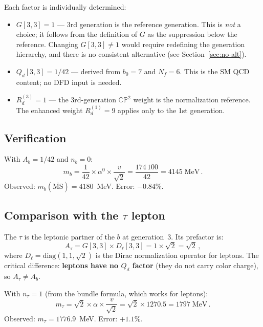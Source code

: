\documentclass[11pt,a4paper]{article}
\newcommand{\CP}{\mathbb{CP}}
\theoremstyle{definition}
\theoremstyle{remark}
\begin{document}
Each factor is individually determined:
\begin{itemize}
\item $G[3,3] = 1$ --- 3rd generation is the reference generation.
      This is \emph{not} a choice; it follows from the definition of $G$
      as the suppression below the reference.  Changing $G[3,3] \neq 1$
      would require redefining the generation hierarchy, and there is no
      consistent alternative (see Section~\ref{sec:no-alt}).
\item $Q_d[3,3] = 1/42$ --- derived from $b_0 = 7$ and $N_f = 6$.
      This is the SM QCD content; no DFD input is needed.
\item $R_d^{(3)} = 1$ --- the 3rd-generation $\CP^2$ weight is the
      normalization reference.  The enhanced weight $R_d^{(1)} = 9$ applies
      only to the 1st generation.
\end{itemize}

\subsection{Verification}

With $A_b = 1/42$ and $n_b = 0$:
\begin{equation}
m_b = \frac{1}{42} \times \alpha^0 \times \frac{v}{\sqrt{2}}
    = \frac{174\,100}{42} = 4145 \;\text{MeV}\,.
\end{equation}
Observed: $m_b(\overline{\text{MS}}) = 4180$~MeV.  Error: $-0.84\%$.

\subsection{Comparison with the $\tau$ lepton}

The $\tau$ is the leptonic partner of the $b$ at generation~3.  Its prefactor is:
\begin{equation}
A_\tau = G[3,3] \times D_\ell[3,3] = 1 \times \sqrt{2} = \sqrt{2}\,,
\end{equation}
where $D_\ell = \text{diag}(1,1,\sqrt{2})$ is the Dirac normalization
operator for leptons.  The critical difference: \textbf{leptons have no
$Q_d$ factor} (they do not carry color charge), so $A_\tau \neq A_b$.

With $n_\tau = 1$ (from the bundle formula, which works for leptons):
\begin{equation}
m_\tau = \sqrt{2} \times \alpha \times \frac{v}{\sqrt{2}}
       = \sqrt{2} \times 1270.5 = 1797 \;\text{MeV}\,.
\end{equation}
Observed: $m_\tau = 1776.9$~MeV.  Error: $+1.1\%$.
\end{document}
